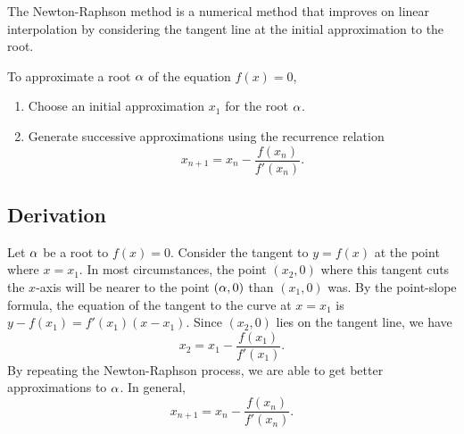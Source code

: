 The Newton-Raphson method is a numerical method that improves on linear interpolation by considering the tangent line at the initial approximation to the root.

\begin{recipe}
    To approximate a root $\alpha$ of the equation $f(x) = 0$,
    \begin{enumerate}
        \item Choose an initial approximation $x_1$ for the root $\alpha$.
        \item Generate successive approximations using the recurrence relation \[x_{n+1} = x_n - \frac{f(x_n)}{f'(x_n)}.\]
    \end{enumerate}
\end{recipe}

\subsection{Derivation}

\begin{figure}[H]
    \centering
    \caption{}
\end{figure}

Let $\alpha$ be a root to $f(x) = 0$. Consider the tangent to $y = f(x)$ at the point where $x = x_1$. In most circumstances, the point $(x_2, 0)$ where this tangent cuts the $x$-axis will be nearer to the point $(\alpha, 0)$ than $(x_1, 0)$ was. By the point-slope formula, the equation of the tangent to the curve at $x = x_1$ is $y - f(x_1) = f'(x_1)(x-x_1)$. Since $(x_2, 0)$ lies on the tangent line, we have \[x_2 = x_1 - \frac{f(x_1)}{f'(x_1)}.\] By repeating the Newton-Raphson process, we are able to get better approximations to $\alpha$. In general, \[x_{n+1} = x_n - \frac{f(x_n)}{f'(x_n)}.\]

